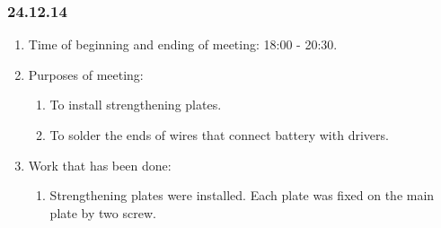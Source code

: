 \subsubsection{24.12.14}
\begin{enumerate}
	
	\item Time of beginning and ending of meeting: 18:00 - 20:30.
	
	\item Purposes of meeting: 
	\begin{enumerate}
		
	    \item To install strengthening plates.
			
		\item  To solder the ends of wires that connect battery with drivers.
		
	\end{enumerate}

	\item Work that has been done:
	\begin{enumerate}
		
		\item Strengthening plates were installed. Each plate was fixed on the main plate by two screw.
		

\end{enumerate}
\end{enumerate}
